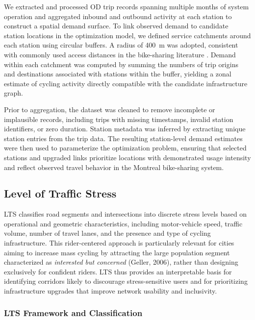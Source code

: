 \documentclass[preprint,authoryear,10pt]{elsarticle}
\begin{document}
We extracted and processed OD trip records spanning multiple months of system operation and aggregated inbound and outbound activity at each station to construct a spatial demand surface. To link observed demand to candidate station locations in the optimization model, we defined service catchments around each station using circular buffers. A radius of 400~m was adopted, consistent with commonly used access distances in the bike-sharing literature \citep{el2017effects}. Demand within each catchment was computed by summing the numbers of trip origins and destinations associated with stations within the buffer, yielding a zonal estimate of cycling activity directly compatible with the candidate infrastructure graph.

Prior to aggregation, the dataset was cleaned to remove incomplete or implausible records, including trips with missing timestamps, invalid station identifiers, or zero duration. Station metadata was inferred by extracting unique station entries from the trip data. The resulting station-level demand estimates were then used to parameterize the optimization problem, ensuring that selected stations and upgraded links prioritize locations with demonstrated usage intensity and reflect observed travel behavior in the Montreal bike-sharing system.


\subsection{Level of Traffic Stress}\label{subsec:lts}

LTS classifies road segments and intersections into discrete stress levels based on operational and geometric characteristics, including motor-vehicle speed, traffic volume, number of travel lanes, and the presence and type of cycling infrastructure. This rider-centered approach is particularly relevant for cities aiming to increase mass cycling by attracting the large population segment characterized as \textit{interested but concerned} (Geller, 2006), rather than designing exclusively for confident riders. LTS thus provides an interpretable basis for identifying corridors likely to discourage stress-sensitive users and for prioritizing infrastructure upgrades that improve network usability and inclusivity.

\subsubsection{LTS Framework and Classification}\label{subsubsec:lts_definition}
\end{document}
